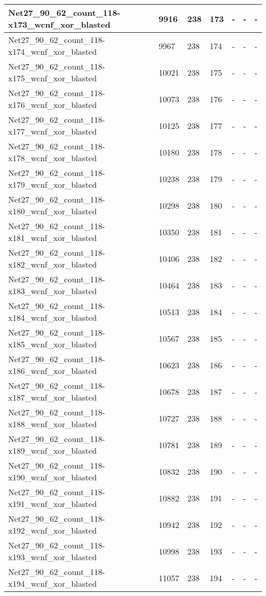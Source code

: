 \begin{scriptsize}
\begin{longtable}{|p{5cm}|l|l|l|l|l|l|}
Net27\_90\_62\_count\_118-x173\_wcnf\_xor\_blasted&9916&238&173&-&-&- \\ \hline 
Net27\_90\_62\_count\_118-x174\_wcnf\_xor\_blasted&9967&238&174&-&-&- \\ \hline 
Net27\_90\_62\_count\_118-x175\_wcnf\_xor\_blasted&10021&238&175&-&-&- \\ \hline 
Net27\_90\_62\_count\_118-x176\_wcnf\_xor\_blasted&10073&238&176&-&-&- \\ \hline 
Net27\_90\_62\_count\_118-x177\_wcnf\_xor\_blasted&10125&238&177&-&-&- \\ \hline 
Net27\_90\_62\_count\_118-x178\_wcnf\_xor\_blasted&10180&238&178&-&-&- \\ \hline 
Net27\_90\_62\_count\_118-x179\_wcnf\_xor\_blasted&10238&238&179&-&-&- \\ \hline 
Net27\_90\_62\_count\_118-x180\_wcnf\_xor\_blasted&10298&238&180&-&-&- \\ \hline 
Net27\_90\_62\_count\_118-x181\_wcnf\_xor\_blasted&10350&238&181&-&-&- \\ \hline 
Net27\_90\_62\_count\_118-x182\_wcnf\_xor\_blasted&10406&238&182&-&-&- \\ \hline 
Net27\_90\_62\_count\_118-x183\_wcnf\_xor\_blasted&10464&238&183&-&-&- \\ \hline 
Net27\_90\_62\_count\_118-x184\_wcnf\_xor\_blasted&10513&238&184&-&-&- \\ \hline 
Net27\_90\_62\_count\_118-x185\_wcnf\_xor\_blasted&10567&238&185&-&-&- \\ \hline 
Net27\_90\_62\_count\_118-x186\_wcnf\_xor\_blasted&10623&238&186&-&-&- \\ \hline 
Net27\_90\_62\_count\_118-x187\_wcnf\_xor\_blasted&10678&238&187&-&-&- \\ \hline 
Net27\_90\_62\_count\_118-x188\_wcnf\_xor\_blasted&10727&238&188&-&-&- \\ \hline 
Net27\_90\_62\_count\_118-x189\_wcnf\_xor\_blasted&10781&238&189&-&-&- \\ \hline 
Net27\_90\_62\_count\_118-x190\_wcnf\_xor\_blasted&10832&238&190&-&-&- \\ \hline 
Net27\_90\_62\_count\_118-x191\_wcnf\_xor\_blasted&10882&238&191&-&-&- \\ \hline 
Net27\_90\_62\_count\_118-x192\_wcnf\_xor\_blasted&10942&238&192&-&-&- \\ \hline 
Net27\_90\_62\_count\_118-x193\_wcnf\_xor\_blasted&10998&238&193&-&-&- \\ \hline 
Net27\_90\_62\_count\_118-x194\_wcnf\_xor\_blasted&11057&238&194&-&-&- \\ \hline 

\end{longtable}
\end{scriptsize}
